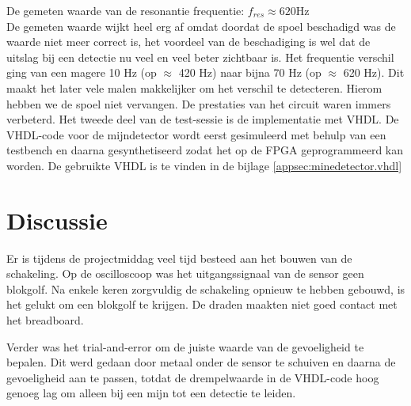 \documentclass{report}
\begin{document}
\noindent De gemeten waarde van de resonantie frequentie:
$f_{res}\approx620 \mathrm{Hz}$\\

De gemeten waarde wijkt heel erg af omdat doordat de spoel beschadigd was de waarde niet meer correct is, het voordeel van de beschadiging is wel dat de uitslag bij een detectie nu veel en veel beter zichtbaar is.
Het frequentie verschil ging van een magere 10 Hz (op $\approx$ 420 Hz) naar bijna 70 Hz (op $\approx$ 620 Hz). Dit maakt het later vele malen makkelijker om het verschil te detecteren.
Hierom hebben we de spoel niet vervangen.
De prestaties van het circuit waren immers verbeterd.
Het tweede deel van de test-sessie is de implementatie met VHDL. De VHDL-code voor de mijndetector wordt eerst gesimuleerd met behulp van een testbench en daarna gesynthetiseerd zodat het op de FPGA geprogrammeerd kan worden. De gebruikte VHDL is te vinden in de bijlage \ref{appsec:minedetector.vhdl}

\section{Discussie}
Er is tijdens de projectmiddag veel tijd besteed aan het bouwen van de schakeling. Op de oscilloscoop was het uitgangssignaal van de sensor geen blokgolf. Na enkele keren zorgvuldig de schakeling opnieuw te hebben gebouwd, is het gelukt om een blokgolf te krijgen. De draden maakten niet goed contact met het breadboard.

Verder was het trial-and-error om de juiste waarde van de gevoeligheid te bepalen. Dit werd gedaan door metaal onder de sensor te schuiven en daarna de gevoeligheid aan te passen, totdat de drempelwaarde in de VHDL-code hoog genoeg lag om alleen bij een mijn tot een detectie te leiden.
\end{document}
